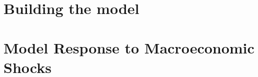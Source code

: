 \documentclass[12pt]{bookest}
\begin{document}

\cleardoublepage

\tableofcontents
\cleardoublepage

\setcounter{page}{7}



\part{Building the model}




\part{Model Response to Macroeconomic Shocks}

 \label{part:2}





\newpage
{}
\printbibliography[heading=bibintoc, title={References}]
\end{document}
